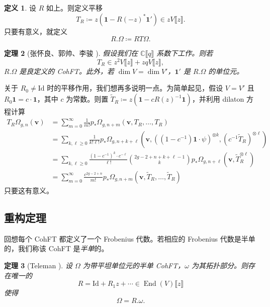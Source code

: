 \documentclass{amsart}
\newtheorem{thm}{定理}[section]
\theoremstyle{definition}
\newtheorem{defn}[thm]{定义}
\theoremstyle{remark}
\theoremstyle{plain}
\theoremstyle{definition}
\theoremstyle{remark}
\newcommand{\C}{\mathbb{C}}
\newcommand{\mbf}[1]{\mathbf{#1}}
\newcommand{\bv}{\mbf{v}}
\newcommand{\mr}[1]{\mathrm{#1}}
\newcommand{\1}{\mathbf{1}}
\newcommand{\2}{\mathbf{2}}
\newcommand{\3}{\mathbf{3}}
\newcommand{\ps}[1]{\llbracket #1 \rrbracket}
\DeclareMathOperator{\End}{End}
\begin{document}
\begin{defn}
    设 \(R\) 如上。则定义平移
    \[ T_R \coloneqq z (\1 - R(-z)^* \1') \in z V\ps{z}. \]
    只要有意义，就定义
    \[ R.\Omega \coloneqq RT\Omega. \]
\end{defn}

\begin{thm}[张怀良、郭帅、李骏 {\cite[定理~2.7]{CGL2026}}]
    假设我们在 \(\C\ps{q}\) 系数下工作。则若
    \[ T_R \in z^2 V \ps{z} + zq V \ps{z}, \]
    \(R.\Omega\) 是良定义的 CohFT。此外，若 \(\dim V = \dim V'\)，\(\1'\) 是 \(R.\Omega\) 的单位元。
\end{thm}

关于 \(R_0 \neq \mr{Id}\) 时的平移作用，我们想再多说明一点。为简单起见，假设 \(V = V'\) 且 \(R_0 \1 = c \cdot \1\)，其中 \(c\) 为常数。则置 \(\tilde{T}_R \coloneqq z( \1 - c R(z)^{-1} \1)\)，并利用 dilaton 方程计算
\begin{align*}
    T_R \Omega_{g,n}(\bv) &= \sum_{m=0}^{\infty} \frac{1}{m!} p_*\Omega_{g,n+m}(\bv, T_R, \ldots, T_R) \\
    &= \sum_{k,\ell \geq 0} \frac{1}{k!\ell!} p_* \Omega_{g,n+k+\ell}(\bv, ( (1-c^{-1})\1 \cdot \psi )^{\otimes k}, ( c^{-1} \tilde{T}_R )^{\otimes \ell}) \\
    &= \sum_{k,\ell \geq 0} \frac{(1-c^{-1})^k \cdot c^{-\ell}}{\ell!} \binom{2g-2+n+k+\ell-1}{k} p_* \Omega_{g,n+\ell}(\bv, \tilde{T}_R^{\otimes \ell}) \\
    &= \sum_{m=0}^{\infty} \frac{c^{2g-2+n}}{m!} p_* \Omega_{g,n+m}(\bv, \tilde{T}_R, \ldots, \tilde{T}_R)
\end{align*}
只要这有意义。


\subsection{重构定理}%
\label{sub:Reconstruction theorem}

回想每个 CohFT 都定义了一个 Frobenius 代数。若相应的 Frobenius 代数是半单的，我们称该 CohFT 是\textit{半单}的。

\begin{thm}[Teleman {\cite{Teleman2012}}]%
\label{thm:teleman}
    设 \(\Omega\) 为带平坦单位元的半单 CohFT，\(\omega\) 为其拓扑部分。则存在唯一的
    \[ R = \mr{Id} + R_1 z + \cdots \in \End(V)\ps{z} \]
    使得
    \[ \Omega = R.\omega. \]
\end{thm}
\end{document}

